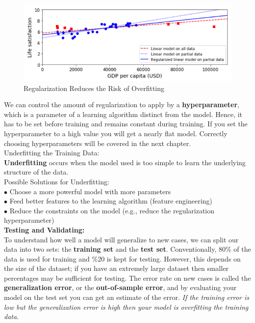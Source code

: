     \begin{figure}[hbt!]
        \centering
        \includegraphics{Resources/Regularization}
        \caption*{Regularization Reduces the Risk of Overfitting}
    \end{figure}

    \noindent We can control the amount of regularization to apply by a \textbf{hyperparameter}, which is a
    parameter of a learning algorithm distinct from the model. Hence, it has to be set before training and
    remains constant during training. If you set the hyperparameter to a high value you will get a nearly
    flat model. Correctly choosing hyperparameters will be covered in the next chapter. \\

    \noindent Underfitting the Training Data: \\
    \textbf{Underfitting} occurs when the model used is too simple to learn the underlying structure of the
    data. \\

    \noindent Possible Solutions for Underfitting: \\
    $\bullet$ Choose a more powerful model with more parameters \\
    $\bullet$ Feed better features to the learning algorithm (feature engineering) \\
    $\bullet$ Reduce the constraints on the model (e.g., reduce the regularization hyperparameter) \\

    \noindent \textbf{Testing and Validating:} \\
    To understand how well a model will generalize to new cases, we can split our data into two sets: the
    \textbf{training set} and the \textbf{test set}. Conventionally, 80\% of the data is used for training
    and \%20 is kept for testing. However, this depends on the size of the dataset; if you have an extremely
    large dataset then smaller percentages may be sufficient for testing. The error rate on new cases is called
    the \textbf{generalization error}, or the \textbf{out-of-sample error}, and by evaluating your model on
    the test set you can get an estimate of the error. \textit{If the training error is low but the
    generalization error is high then your model is overfitting the training data.} \\

